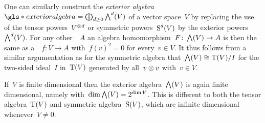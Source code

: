 \begin{remark}
  One can similarly construct the \emph{exterior algebra}~$\gls*{exterior algebra} = \bigoplus_{d \geq 0} \Exterior^d(V)$ of a vector space~$V$ by replacing the use of the tensor powers~$V^{\otimes d}$ or symmetric powers~$\operatorname{S}^d(V)$ by the exterior powers~$\bigwedge^d(V)$.
  For any other~{\algebra{$\kf$}}~$A$ an algebra homomorphism~$F \colon \bigwedge(V) \to A$ is then the same as a~{\linear{$\kf$}}~$f \colon V \to A$ with~$f(v)^2 = 0$ for every~$v \in V$.
  It thus follows from a similar argumentation as for the symmetric algebra that~$\bigwedge(V) \cong \operatorname{T}(V)/I$ for the two-sided ideal~$I$ in~$\operatorname{T}(V)$ generated by all~$v \otimes v$ with~$v \in V$.
  
  
  If~$V$ is finite dimensional then the exterior algebra~$\bigwedge(V)$ is again finite dimensional, namely with~$\dim \bigwedge(V) = 2^{\dim V}$.
  This is different to both the tensor algebra~$\operatorname{T}(V)$ and symmetric algebra~$\operatorname{S}(V)$, which are infinite dimensional whenever~$V \neq 0$.
\end{remark}




